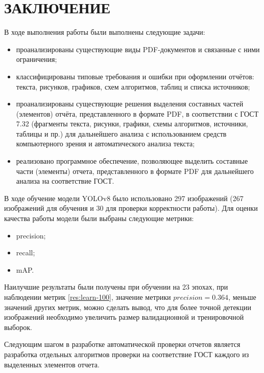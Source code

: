 \chapter*{ЗАКЛЮЧЕНИЕ}

В ходе выполнения работы были выполнены следующие задачи:
\begin{itemize}
	\item проанализированы существующие виды PDF-документов и связанные с ними ограничения;
	\item классифицированы типовые требования и ошибки при оформлении отчётов: текста, рисунков, графиков, схем алгоритмов, таблиц и списка источников;
	\item проанализированы существующие решения выделения составных частей (элементов) отчёта, представленного в формате PDF, в соответствии с ГОСТ 7.32 (фрагменты текста, рисунки, графики, схемы алгоритмов, источники, таблицы и пр.) для дальнейшего анализа с использованием средств компьютерного зрения и автоматического анализа текста;
	\item реализовано программное обеспечение, позволяющее выделить составные части (элементы) отчета, представленного в формате PDF для дальнейшего анализа на соответствие ГОСТ. 
\end{itemize}

В ходе обучение модели YOLOv8 было использовано 297 изображений (267 изображений для обучения и 30 для проверки корректности работы). Для оценки качества работы модели были выбраны следующие метрики:
\begin{itemize}
\item precision;
\item recall;
\item mAP.
\end{itemize}
Наилучшие результаты были получены при обучении на 23 эпохах, при наблюдении метрик \ref{res:learn-100}, значение метрики $precision = 0.364$, меньше значений
других метрик, можно сделать вывод, что для более точной детекции изображений необходимо увеличить размер валидационной и тренировочной выборок.

Следующим шагом в разработке автоматической проверки отчетов является разработка отдельных алгоритмов проверки на соответствие ГОСТ каждого из выделенных элементов отчета.

